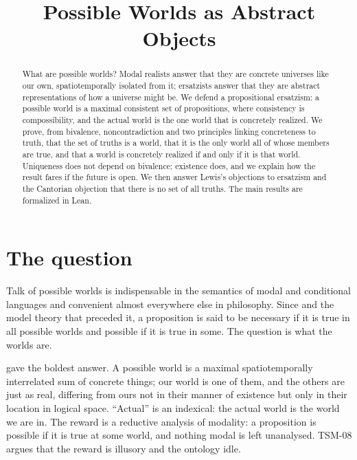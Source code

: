 \documentclass{situationist-preprint}
\title{Possible Worlds as Abstract Objects}
\begin{document}
\maketitle

\begin{abstract}
What are possible worlds? Modal realists answer that they are concrete universes like our own, spatiotemporally isolated from it; ersatzists answer that they are abstract representations of how a universe might be. We defend a propositional ersatzism: a possible world is a maximal consistent set of propositions, where consistency is compossibility, and the actual world is the one world that is concretely realized. We prove, from bivalence, noncontradiction and two principles linking concreteness to truth, that the set of truths is a world, that it is the only world all of whose members are true, and that a world is concretely realized if and only if it is that world. Uniqueness does not depend on bivalence; existence does, and we explain how the result fares if the future is open. We then answer Lewis's objections to ersatzism and the Cantorian objection that there is no set of all truths. The main results are formalized in Lean.
\end{abstract}

\section{The question}

Talk of possible worlds is indispensable in the semantics of modal and conditional languages and convenient almost everywhere else in philosophy. Since \citet{Kripke1980} and the model theory that preceded it, a proposition is said to be necessary if it is true in all possible worlds and possible if it is true in some. The question is what the worlds are.

\citet{Lewis1986} gave the boldest answer. A possible world is a maximal spatiotemporally interrelated sum of concrete things; our world is one of them, and the others are just as real, differing from ours not in their manner of existence but only in their location in logical space. \enquote{Actual} is an indexical: the actual world is the world we are in. The reward is a reductive analysis of modality: a proposition is possible if it is true at some world, and nothing modal is left unanalysed. TSM-08 argues that the reward is illusory and the ontology idle.
\end{document}
